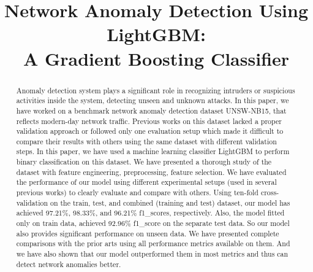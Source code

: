 \documentclass[14pt, conference]{IEEEtran}
\begin{document}
\title{Network Anomaly Detection Using LightGBM: \\ A Gradient Boosting Classifier}

\author{

}

\maketitle

\begin{abstract}
Anomaly detection system plays a significant role in recognizing intruders or suspicious activities inside the system, detecting unseen and unknown attacks. In this paper, we have worked on a benchmark network anomaly detection dataset UNSW-NB15, that reflects modern-day network traffic. Previous works on this dataset lacked a proper validation approach or followed only one evaluation setup which made it difficult to compare their results with others using the same dataset with different validation steps. In this paper, we have used a machine learning classifier LightGBM to perform binary classification on this dataset. We have presented a thorough study of the dataset with feature engineering, preprocessing, feature selection. We have evaluated the performance of our model using different experimental setups (used in several previous works)  to clearly evaluate and compare with others. Using ten-fold cross-validation on the train, test, and combined (training and test) dataset, our model has achieved 97.21\%, 98.33\%, and 96.21\% f1\_scores, respectively. Also, the model fitted only on train data, achieved 92.96\% f1\_score on the separate test data. So our model also provides significant performance on unseen data. We have presented complete comparisons with the prior arts using all performance metrics available on them. And we have also shown that our model outperformed them in most metrics and thus can detect network anomalies better.

\end{abstract}
\end{document}
